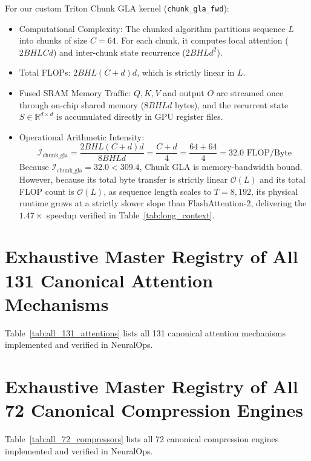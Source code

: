 \documentclass{article}
\begin{document}
For our custom Triton Chunk GLA kernel (\texttt{chunk\_gla\_fwd}):
\begin{itemize}
    \item Computational Complexity: The chunked algorithm partitions sequence $L$ into chunks of size $C = 64$. For each chunk, it computes local attention ($2 B H L C d$) and inter-chunk state recurrence ($2 B H L d^2$).
    \item Total FLOPs: $2 B H L (C + d) d$, which is strictly linear in $L$.
    \item Fused SRAM Memory Traffic: $Q, K, V$ and output $O$ are streamed once through on-chip shared memory ($8 B H L d$ bytes), and the recurrent state $S \in \mathbb{R}^{d \times d}$ is accumulated directly in GPU register files.
    \item Operational Arithmetic Intensity:
    \begin{equation}
        \mathcal{I}_{\text{chunk\_gla}} = \frac{2 B H L (C + d) d}{8 B H L d} = \frac{C + d}{4} = \frac{64 + 64}{4} = 32.0 \text{ FLOP/Byte}
    \end{equation}
    Because $\mathcal{I}_{\text{chunk\_gla}} = 32.0 < 309.4$, Chunk GLA is memory-bandwidth bound. However, because its total byte transfer is strictly linear $\mathcal{O}(L)$ and its total FLOP count is $\mathcal{O}(L)$, as sequence length scales to $T=8,192$, its physical runtime grows at a strictly slower slope than FlashAttention-2, delivering the $1.47\times$ speedup verified in Table~\ref{tab:long_context}.
\end{itemize}

\clearpage
\section{Exhaustive Master Registry of All 131 Canonical Attention Mechanisms}
\label{app:attentions}
Table~\ref{tab:all_131_attentions} lists all 131 canonical attention mechanisms implemented and verified in NeuralOps.


\clearpage
\section{Exhaustive Master Registry of All 72 Canonical Compression Engines}
\label{app:compressors}
Table~\ref{tab:all_72_compressors} lists all 72 canonical compression engines implemented and verified in NeuralOps.


\clearpage
\end{document}
